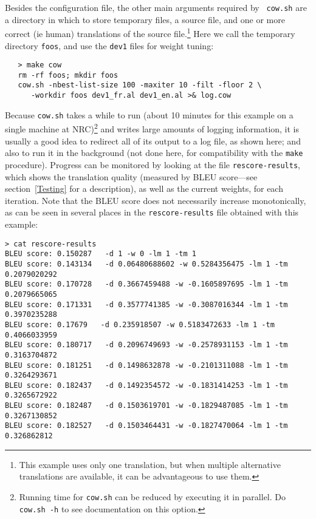 \documentclass[11pt]{article}
\begin{document}
Besides the configuration file, the other main arguments required by {\tt
  cow.sh} are a directory in which to store temporary files, a source file, and
  one or more correct (ie human) translations of the source
  file.\footnote{This example uses only one translation, but when multiple
  alternative translations are available, it can be advantageous to use them.}
Here we call the temporary
directory {\tt foos}, and use the {\tt dev1} files for weight tuning:
\begin{verbatim}
   > make cow
   rm -rf foos; mkdir foos
   cow.sh -nbest-list-size 100 -maxiter 10 -filt -floor 2 \
      -workdir foos dev1_fr.al dev1_en.al >& log.cow
\end{verbatim}
Because {\tt cow.sh} takes a while to run 
(about 10 minutes for this
example on a single machine at NRC)\footnote{Running time for {\tt cow.sh} can be
  reduced by executing it in parallel. Do {\tt cow.sh -h} to see documentation on
  this option.}
and writes large amounts of logging
information, it is usually a good idea to redirect all of its output to a log
file, as shown here; and also to run it in the background (not done here, for
compatibility with the {\tt make} procedure).  Progress can be monitored by
looking at the file {\tt rescore-results}, which
shows the translation quality (measured by BLEU score---see
section~\ref{Testing} for a description), as well as the current weights, for
each iteration. Note that the BLEU score does not necessarily increase
monotonically, as can be seen in several places in the {\tt rescore-results}
file obtained with this example:
\begin{verbatim}
> cat rescore-results
BLEU score: 0.150287   -d 1 -w 0 -lm 1 -tm 1
BLEU score: 0.143134   -d 0.06480688602 -w 0.5284356475 -lm 1 -tm 0.2079020292
BLEU score: 0.170728   -d 0.3667459488 -w -0.1605897695 -lm 1 -tm 0.2079665065
BLEU score: 0.171331   -d 0.3577741385 -w -0.3087016344 -lm 1 -tm 0.3970235288
BLEU score: 0.17679   -d 0.235918507 -w 0.5183472633 -lm 1 -tm 0.4066033959
BLEU score: 0.180717   -d 0.2096749693 -w -0.2578931153 -lm 1 -tm 0.3163704872
BLEU score: 0.181251   -d 0.1498632878 -w -0.2101311088 -lm 1 -tm 0.3264293671
BLEU score: 0.182437   -d 0.1492354572 -w -0.1831414253 -lm 1 -tm 0.3265672922
BLEU score: 0.182487   -d 0.1503619701 -w -0.1829487085 -lm 1 -tm 0.3267130852
BLEU score: 0.182527   -d 0.1503464431 -w -0.1827470064 -lm 1 -tm 0.326862812
\end{verbatim}
\end{document}
